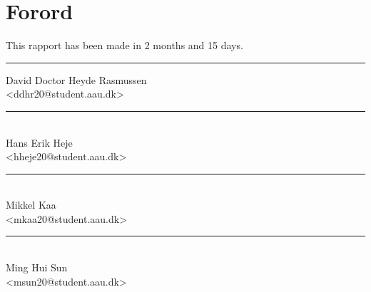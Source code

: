 \section*{Forord}%

This rapport has been made in 2 months and 15 days.

\vfill\noindent

\begin{center}
  \begin{minipage}[b]{0.45\textwidth}
    \centering
    \rule{\textwidth}{0.5pt}
     David Doctor Heyde Rasmussen\\
    {\footnotesize <ddhr20@student.aau.dk>}
   \end{minipage}
\hfill
\begin{minipage}[b]{0.45\textwidth}
  \centering
  \rule{\textwidth}{0.5pt}\\
   Hans Erik Heje\\
  {\footnotesize <hheje20@student.aau.dk>}
 \end{minipage}
\vspace{3\baselineskip}
\end{center}

\begin{center}
\begin{minipage}[b]{0.45\textwidth}
 \centering
 \rule{\textwidth}{0.5pt}\\
  Mikkel Kaa\\
 {\footnotesize <mkaa20@student.aau.dk>}
\end{minipage}
\hfill
\begin{minipage}[b]{0.45\textwidth}
 \centering
 \rule{\textwidth}{0.5pt}\\
  Ming Hui Sun\\
 {\footnotesize <msun20@student.aau.dk>}
\end{minipage}
\end{center}